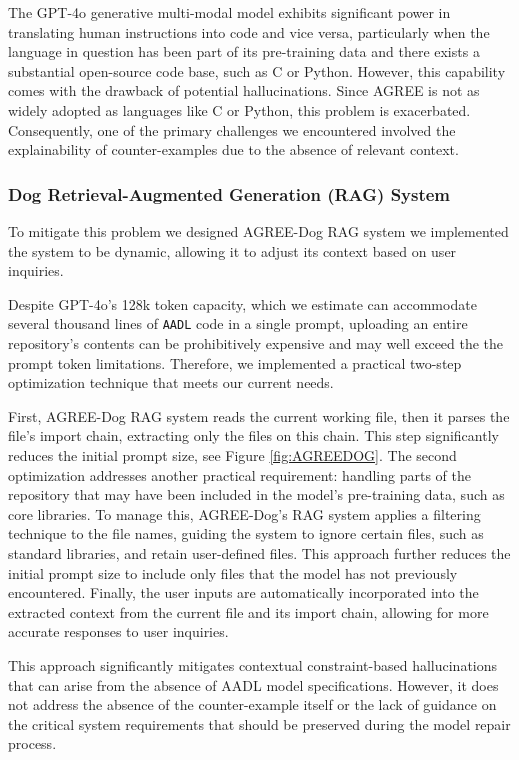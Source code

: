 The GPT-4o generative multi-modal model exhibits significant power in translating human instructions into code and vice versa, particularly when the language in question has been part of its pre-training data and there exists a substantial open-source code base, such as C or Python. However, this capability comes with the drawback of potential hallucinations. Since AGREE is not as widely adopted as languages like C or Python, this problem is exacerbated. Consequently, one of the primary challenges we encountered involved the explainability of counter-examples due to the absence of relevant context.
\subsubsection{Dog Retrieval-Augmented Generation (RAG) System}

 To mitigate this problem we designed AGREE-Dog RAG system we implemented the system to be dynamic, allowing it to adjust its context based on user inquiries. 


Despite GPT-4o's 128k token capacity, which we estimate can accommodate several thousand lines of \texttt{AADL} code in a single prompt, uploading an entire repository's contents can be prohibitively expensive and may well exceed the the prompt token limitations. Therefore, we implemented a practical two-step optimization technique that meets our current needs.

First, AGREE-Dog RAG system reads the current working file, then it parses the file's import chain, extracting only the files on this chain. This step significantly reduces the initial prompt size, see Figure \ref{fig:AGREEDOG}.  
%
The second optimization addresses another practical requirement: handling parts of the repository that may have been included in the model's pre-training data, such as core libraries. To manage this, AGREE-Dog's RAG system applies a filtering technique to the file names, guiding the system to ignore certain files, such as standard libraries, and retain user-defined files. This approach further reduces the initial prompt size to include only files that the model has not previously encountered. Finally, the user inputs are automatically incorporated into the extracted context from the current file and its import chain, allowing for more accurate responses to user inquiries.

This approach significantly mitigates contextual constraint-based hallucinations that can arise from the absence of AADL model specifications. However, it does not address the absence of the counter-example itself or the lack of guidance on the critical system requirements that should be preserved during the model repair process.
 

